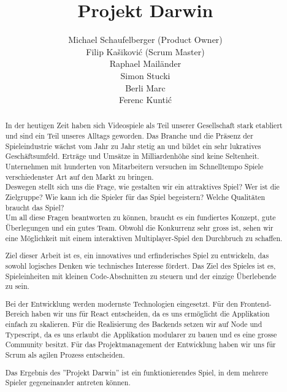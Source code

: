 \documentclass[11pt,a4paper,titlepage]{article}
\author{Michael Schaufelberger (Product Owner)\\
Filip Kašiković (Scrum Master)\\
Raphael Mailänder\\
Simon Stucki\\
Berli Marc\\
Ferenc Kuntić}
\title{Projekt Darwin}
\begin{document}
\maketitle


\begin{abstract}

In der heutigen Zeit haben sich Videospiele als Teil unserer Gesellschaft stark etabliert und sind ein Teil unseres Alltags geworden. Das Branche und die Präsenz der Spieleindustrie wächst vom Jahr zu Jahr stetig an und bildet ein sehr lukratives Geschäftsumfeld. Erträge und Umsätze in Milliardenhöhe sind keine Seltenheit. Unternehmen mit hunderten von Mitarbeitern versuchen im Schnelltempo Spiele verschiedenster Art auf den Markt zu bringen. 
\\Deswegen stellt sich uns die Frage, wie gestalten wir ein attraktives Spiel? Wer ist die Zielgruppe? Wie kann ich die Spieler für das Spiel begeistern? Welche Qualitäten braucht das Spiel?
\\Um all diese Fragen beantworten zu können, braucht es ein fundiertes Konzept, gute Überlegungen und ein gutes Team. Obwohl die Konkurrenz sehr gross ist, sehen wir eine Möglichkeit mit einem interaktiven Multiplayer-Spiel den Durchbruch zu schaffen.

Ziel dieser Arbeit ist es, ein innovatives und erfinderisches Spiel zu entwickeln, das sowohl logisches Denken wie technisches Interesse fördert. Das Ziel des Spieles ist es, Spieleinheiten mit kleinen Code-Abschnitten zu steuern und der einzige Überlebende zu sein.

Bei der Entwicklung werden modernste Technologien eingesetzt. Für den Frontend-Bereich haben wir uns für React entscheiden, da es uns ermöglicht die Applikation einfach zu skalieren. Für die Realisierung des Backends setzen wir auf Node und Typescript, da es uns erlaubt die Applikation modularer zu bauen und es eine grosse Community besitzt.
Für das Projektmanagement der Entwicklung haben wir uns für Scrum als agilen Prozess entscheiden.

Das Ergebnis des ''Projekt Darwin'' ist ein funktionierendes Spiel, in dem mehrere Spieler gegeneinander antreten können.

\end{abstract}
\end{document}
